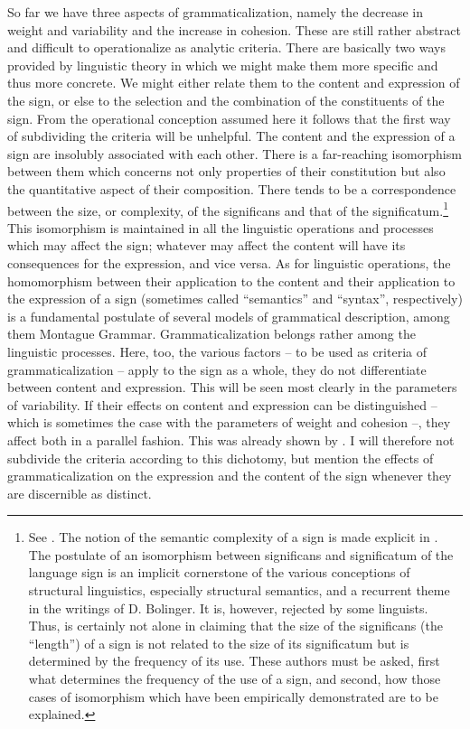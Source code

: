 So far we have three aspects of grammaticalization, namely the decrease in weight and variability and the increase in cohesion. These are still rather abstract and difficult to operationalize as analytic criteria. There are basically two ways provided by linguistic theory in which we might make them more specific and thus more concrete. We might either relate them to the content and expression of the sign, or else to the selection and the combination of the constituents of the sign. From the operational conception assumed here it follows that the first way of subdividing the criteria will be unhelpful. The content and the expression of a sign are insolubly associated with each other. There is a far-reaching isomorphism between them which concerns not only properties of their constitution but also the quantitative aspect of their composition. There tends to be a correspondence between the size, or complexity, of the significans and that of the significatum.\footnote{See \citet{Lehmann1974}. The notion of the semantic complexity of a sign is made explicit in \citet{Lehmann1978}. The postulate of an isomorphism between significans and significatum of the language sign is an implicit cornerstone of the various conceptions of structural linguistics, especially structural semantics, and a recurrent theme in the writings of D. Bolinger. It is, however, rejected by some linguists. Thus, \citet[239]{Ronneberger-Sibold1980} is certainly not alone in claiming that the size of the significans (the “length”) of a sign is not related to the size of its significatum but is determined by the frequency of its use. These authors must be asked, first what determines the frequency of the use of a sign, and second, how those cases of isomorphism which have been empirically demonstrated are to be explained.} This isomorphism is maintained in all the linguistic operations and processes which may affect the sign; whatever may affect the content will have its consequences for the expression, and vice versa. As for linguistic operations, the homomorphism between their application to the content and their application to the expression of a sign (sometimes called “semantics” and “syntax”, respectively) is a fundamental postulate of several models of grammatical description, among them Montague Grammar. Grammaticalization belongs rather among the linguistic processes. Here, too, the various factors -- to be used as criteria of grammaticalization -- apply to the sign as a whole, they do not differentiate between content and expression. This will be seen most clearly in the parameters of variability. If their effects on content and expression can be distinguished -- which is sometimes the case with the parameters of weight and cohesion --, they affect both in a parallel fashion. This was already shown by \citet[135--139]{Meillet1912}. I will therefore not subdivide the criteria according to this dichotomy, but mention the effects of grammaticalization on the expression and the content of the sign whenever they are discernible as distinct.

